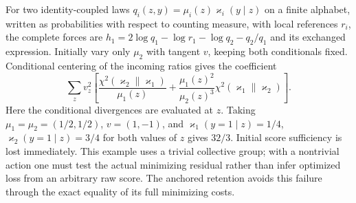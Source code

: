 For two identity-coupled laws $q_i(z,y)=\mu_i(z)\varkappa_i(y\mid z)$ on a finite alphabet, written as probabilities with respect to counting measure, with local references $r_i$, the complete forces are
$h_1=2\log q_1-\log r_1-\log q_2-q_2/q_1$ and its exchanged expression. Initially vary only $\mu_2$ with tangent $v$, keeping both conditionals fixed. Conditional centering of the incoming ratios gives the coefficient
\begin{equation}
\sum_z v_z^2\left[
\frac{\chi^2(\varkappa_2\|\varkappa_1)}{\mu_1(z)}
+\frac{\mu_1(z)^2}{\mu_2(z)^3}\chi^2(\varkappa_1\|\varkappa_2)
\right].
\end{equation}
Here the conditional divergences are evaluated at $z$. Taking
$\mu_1=\mu_2=(1/2,1/2)$, $v=(1,-1)$, and $\varkappa_1(y=1\mid z)=1/4$, $\varkappa_2(y=1\mid z)=3/4$ for both values of $z$ gives $32/3$. Initial score sufficiency is lost immediately. This example uses a trivial collective group; with a nontrivial action one must test the actual minimizing residual rather than infer optimized loss from an arbitrary raw score. The anchored retention avoids this failure through the exact equality of its full minimizing costs.
